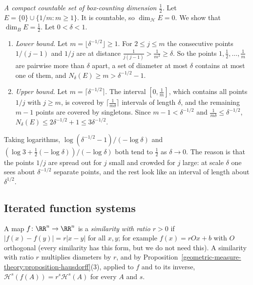 \begin{example}\label{geometric-measure-theory:example-box-hausdorff}
\emph{A compact countable set of box-counting dimension $\frac12$.} Let $E = \{0\} \cup \{1/m : m \geq 1\}$. It is countable, so $\dim_{\mathcal{H}}E = 0$. We show that $\dim_BE = \frac12$. Let
$0 < \delta < 1$.
\begin{enumerate}
\item \emph{Lower bound.} Let $m = \lfloor\delta^{-1/2}\rfloor \geq 1$. For $2 \leq j \leq m$ the consecutive points $1/(j-1)$ and $1/j$ are at distance
$\frac1{j(j-1)} > \frac1{m^2} \geq \delta$. So the points $1, \frac12, \ldots, \frac1m$ are pairwise more than $\delta$ apart, a set of diameter at most $\delta$ contains at most one of them, and
$N_\delta(E) \geq m > \delta^{-1/2} - 1$.
\item \emph{Upper bound.} Let $m = \lceil\delta^{-1/2}\rceil$. The interval $[0, \frac1m]$, which contains all points $1/j$ with $j \geq m$, is covered by $\lceil\frac1{m\delta}\rceil$ intervals of
length $\delta$, and the remaining $m - 1$ points are covered by singletons. Since $m - 1 < \delta^{-1/2}$ and $\frac1{m\delta} \leq \delta^{-1/2}$, $N_\delta(E) \leq 2\delta^{-1/2} + 1 \leq 3\delta^{-1/2}$.
\end{enumerate}
Taking logarithms, $\log(\delta^{-1/2} - 1)/(-\log\delta)$ and $(\log 3 + \frac12(-\log\delta))/(-\log\delta)$ both tend to $\frac12$ as $\delta \to 0$. The reason is that the points $1/j$ are spread
out for $j$ small and crowded for $j$ large: at scale $\delta$ one sees about $\delta^{-1/2}$ separate points, and the rest look like an interval of length about $\delta^{1/2}$.
\end{example}

\subsection{Iterated function systems}\label{geometric-measure-theory:subsection-iterated-function-systems}

A map $f \colon \RR^n \to \RR^n$ is a \emph{similarity with ratio $r > 0$} if $|f(x) - f(y)| = r|x - y|$ for all $x, y$; for example $f(x) = rOx + b$ with $O$ orthogonal (every similarity has this
form, but we do not need this). A similarity with ratio $r$ multiplies diameters by $r$, and by Proposition~\ref{geometric-measure-theory:proposition-hausdorff}(3), applied to $f$ and to its inverse,
$\mathcal{H}^s(f(A)) = r^s\mathcal{H}^s(A)$ for every $A$ and $s$.

